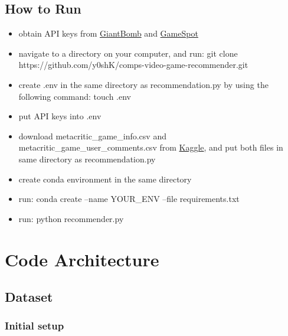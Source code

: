 \documentclass[10pt,twocolumn]{article}
\begin{document}
\subsection{How to Run}

\begin{itemize}
    \item obtain API keys from \href{https://www.giantbomb.com/api/}{GiantBomb} and \href{https://www.gamespot.com/api/}{GameSpot}
    \item navigate to a directory on your computer, and run: 
    git clone https://github.com/y0shK/comps-video-game-recommender.git
    \item create .env in the same directory as recommendation.py by using the following command: touch .env
    \item put API keys into .env
    \item download metacritic\_game\_info.csv and metacritic\_game\_user\_comments.csv from \href{https://www.kaggle.com/datasets/dahlia25/metacritic-video-game-comments}{Kaggle}, and put both files in same directory as recommendation.py
    \item create conda environment in the same directory
    \item run:
    conda create --name YOUR\_ENV --file requirements.txt
    \item run:
    python recommender.py
\end{itemize}

\section{Code Architecture}


\subsection{Dataset}

\subsubsection{Initial setup}
\end{document}
